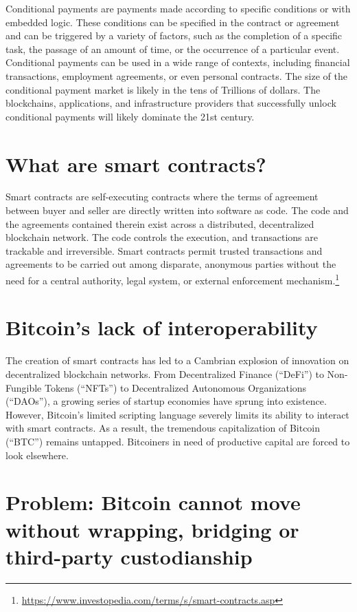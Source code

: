 \documentclass[twoside, a4paper, 11pt]{article}
\begin{document}
  Conditional payments are payments made according to specific conditions or with embedded logic. These conditions can be specified in the contract or agreement and can be triggered by a variety of factors, such as the completion of a specific task, the passage of an amount of time, or the occurrence of a particular event. Conditional payments can be used in a wide range of contexts, including financial transactions, employment agreements, or even personal contracts. The size of the conditional payment market is likely in the tens of Trillions of dollars. The blockchains, applications, and infrastructure providers that successfully unlock conditional payments will likely dominate the 21st century.

  \section{What are smart contracts?}

  Smart contracts are self-executing contracts where the terms of agreement between buyer and seller are directly written into software as code. The code and the agreements contained therein exist across a distributed, decentralized blockchain network. The code controls the execution, and transactions are trackable and irreversible. Smart contracts permit trusted transactions and agreements to be carried out among disparate, anonymous parties without the need for a central authority, legal system, or external enforcement mechanism.\footnote{\url{ https://www.investopedia.com/terms/s/smart-contracts.asp}}

  \section{Bitcoin’s lack of interoperability}

  The creation of smart contracts has led to a Cambrian explosion of innovation on decentralized blockchain networks. From Decentralized Finance (“DeFi”) to Non-Fungible Tokens (“NFTs”) to Decentralized Autonomous Organizations (“DAOs”), a growing series of startup economies have sprung into existence. However, Bitcoin’s limited scripting language severely limits its ability to interact with smart contracts. As a result, the tremendous capitalization of Bitcoin (“BTC”) remains untapped. Bitcoiners in need of productive capital are forced to look elsewhere.

  \section{Problem: Bitcoin cannot move without wrapping, bridging or third-party custodianship}
\end{document}
